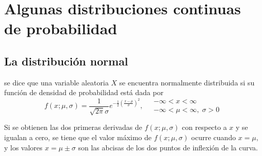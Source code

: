 \chapter{Algunas distribuciones continuas de probabilidad}

\section{La distribución normal}

\begin{tcolorbox}
    \begin{def.}
	se dice que una variable aleatoria $X$ se encuentra normalmente distribuida si su función de densidad de probabilidad está dada por 
	$$f(x;\mu,\sigma) = \dfrac{1}{\sqrt{2\pi}\sigma} e^{-\frac{1}{2}\left(\frac{x-\mu}{\sigma}\right)^2},\quad \begin{array}{l}-\infty<x<\infty \\ -\infty<\mu<\infty,\; \sigma>0\end{array}$$
    \end{def.}
\end{tcolorbox}

Si se obtienen las dos primeras derivadas de $f(x;\mu,\sigma)$ con respecto a $x$ y se igualan a cero, se tiene que el valor máximo de $f(x;\mu,\sigma)$ ocurre cuando $x=\mu,$ y los valores $x=\mu\pm \sigma$ son las abcisas de los dos puntos de inflexión de la curva.\\\\

